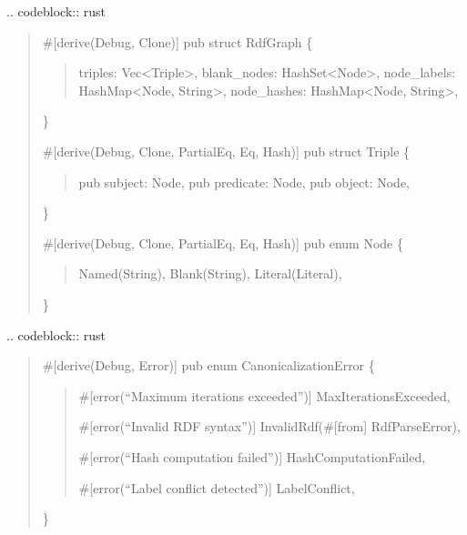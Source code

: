 \documentclass[letterpaper,10pt,english]{sphinxmanual}
\begin{document}
\sphinxAtStartPar
{}
.. code\sphinxhyphen{}block:: rust
\begin{quote}

\sphinxAtStartPar
\#{[}derive(Debug, Clone){]}
pub struct RdfGraph \{
\begin{quote}

\sphinxAtStartPar
triples: Vec\textless{}Triple\textgreater{},
blank\_nodes: HashSet\textless{}Node\textgreater{},
node\_labels: HashMap\textless{}Node, String\textgreater{},
node\_hashes: HashMap\textless{}Node, String\textgreater{},
\end{quote}

\sphinxAtStartPar
\}

\sphinxAtStartPar
\#{[}derive(Debug, Clone, PartialEq, Eq, Hash){]}
pub struct Triple \{
\begin{quote}

\sphinxAtStartPar
pub subject: Node,
pub predicate: Node,
pub object: Node,
\end{quote}

\sphinxAtStartPar
\}

\sphinxAtStartPar
\#{[}derive(Debug, Clone, PartialEq, Eq, Hash){]}
pub enum Node \{
\begin{quote}

\sphinxAtStartPar
Named(String),
Blank(String),
Literal(Literal),
\end{quote}

\sphinxAtStartPar
\}
\end{quote}

\sphinxAtStartPar
{}
.. code\sphinxhyphen{}block:: rust
\begin{quote}

\sphinxAtStartPar
\#{[}derive(Debug, Error){]}
pub enum CanonicalizationError \{
\begin{quote}

\sphinxAtStartPar
\#{[}error(“Maximum iterations exceeded”){]}
MaxIterationsExceeded,

\sphinxAtStartPar
\#{[}error(“Invalid RDF syntax”){]}
InvalidRdf(\#{[}from{]} RdfParseError),

\sphinxAtStartPar
\#{[}error(“Hash computation failed”){]}
HashComputationFailed,

\sphinxAtStartPar
\#{[}error(“Label conflict detected”){]}
LabelConflict,
\end{quote}

\sphinxAtStartPar
\}
\end{quote}
\end{document}
